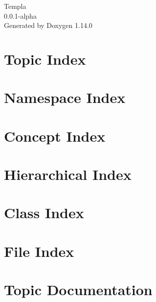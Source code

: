 \documentclass[twoside]{book}
\newcommand{\+}{\discretionary{\mbox{\scriptsize$\hookleftarrow$}}{}{}}
\newcommand{\clearemptydoublepage}{%
    \newpage{\pagestyle{empty}\cleardoublepage}%
  }
\begin{document}
  \raggedbottom
    \hypersetup{pageanchor=false,
                bookmarksnumbered=true,
                pdfencoding=unicode
               }
  \begin{titlepage}
  \vspace*{7cm}
  \begin{center}%
  {\Large Templa}\\
  [1ex]\large 0.\+0.\+1-\/alpha \\
  \vspace*{1cm}
  {\large Generated by Doxygen 1.14.0}\\
  \end{center}
  \end{titlepage}
  \clearemptydoublepage
  \tableofcontents
  \clearemptydoublepage
  \hypersetup{pageanchor=true}
\chapter{Topic Index}

\chapter{Namespace Index}

\chapter{Concept Index}

\chapter{Hierarchical Index}

\chapter{Class Index}

\chapter{File Index}

\chapter{Topic Documentation}








\end{document}
